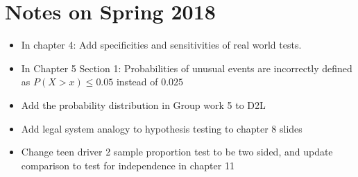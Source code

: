 \documentclass{article}
\begin{document}
\section{Notes on Spring 2018}

\begin{itemize}
\item In chapter 4: Add specificities and sensitivities of real world tests.

\item In Chapter 5 Section 1: Probabilities of unusual events are incorrectly defined as $P(X > x) \le 0.05$ instead of $0.025$

\item Add the probability distribution in Group work 5 to D2L

\item Add legal system analogy to hypothesis testing to chapter 8 slides

\item Change teen driver 2 sample proportion test to be two sided, and update comparison to test for independence in chapter 11

\end{itemize}
\end{document}

